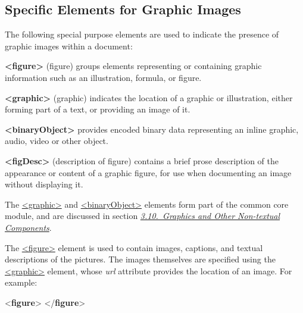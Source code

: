 \subsection[{Specific Elements for Graphic Images}]{Specific Elements for Graphic Images}\label{FTGRA}\par
The following special purpose elements are used to indicate the presence of graphic images within a document: 
\begin{sansreflist}
  
\item [\textbf{<figure>}] (figure) groups elements representing or containing graphic information such as an illustration, formula, or figure.
\item [\textbf{<graphic>}] (graphic) indicates the location of a graphic or illustration, either forming part of a text, or providing an image of it.
\item [\textbf{<binaryObject>}] provides encoded binary data representing an inline graphic, audio, video or other object.
\item [\textbf{<figDesc>}] (description of figure) contains a brief prose description of the appearance or content of a graphic figure, for use when documenting an image without displaying it.
\end{sansreflist}
\par
The \hyperref[TEI.graphic]{<graphic>} and \hyperref[TEI.binaryObject]{<binaryObject>} elements form part of the common core module, and are discussed in section \textit{\hyperref[COGR]{3.10.\ Graphics and Other Non-textual Components}}.\par
The \hyperref[TEI.figure]{<figure>} element is used to contain images, captions, and textual descriptions of the pictures. The images themselves are specified using the \hyperref[TEI.graphic]{<graphic>} element, whose {\itshape url} attribute provides the location of an image. For example: \par\bgroup{}\exampleFont \begin{shaded}\noindent\mbox{}{<\textbf{figure}>}\mbox{}\newline 
{}\mbox{}\newline 
{</\textbf{figure}>}\end{shaded}\egroup\par \par
